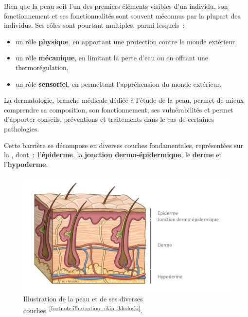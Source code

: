 Bien que la peau soit l'un des premiers éléments visibles d'un individu, son fonctionnement et ses fonctionnalités sont souvent méconnus par la plupart des individus. Ses rôles sont pourtant multiples, parmi lesquels~:
\begin{itemize}
    \item un rôle \textbf{physique}, en apportant une protection contre le monde extérieur,
    \item un rôle \textbf{mécanique}, en limitant la perte d’eau ou en offrant une thermorégulation,
    \item un rôle \textbf{sensoriel}, en permettant l'appréhension du monde extérieur.
\end{itemize}\par

La dermatologie, branche médicale dédiée à l’étude de la peau, permet de mieux comprendre sa composition, son fonctionnement, ses vulnérabilités et permet d’apporter conseils, préventions et traitements dans le cas de certaines pathologies.\par

Cette barrière se décompose en diverses couches fondamentales, représentées sur la , dont~:~l’\textbf{épiderme}, la \textbf{jonction dermo-épidermique}, le \textbf{derme} et l’\textbf{hypoderme}.\par
\begin{figure}[H]
    \centering
    \includegraphics[width=0.75\linewidth]{contents/chapter_1/resources/illustration_skin_kholoski.pdf}
    \caption{Illustration de la peau et de ses diverses couches~\textsuperscript{\ref{footnote:illustration_skin_kholoski}}.}
    \label{fig:illustration_skin_kholoski}
\end{figure}\par 

\addtocounter{footnote}{1}

